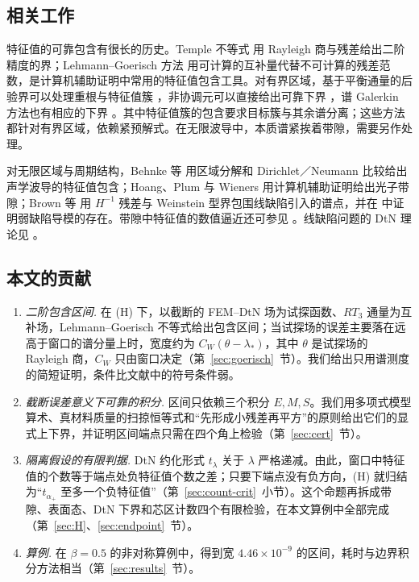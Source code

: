 \documentclass[11pt,a4paper,fontset=fandol]{ctexart}
\theoremstyle{plain}
\theoremstyle{definition}
\theoremstyle{remark}
\begin{document}
\subsection*{相关工作}

特征值的可靠包含有很长的历史。Temple 不等式 \cite{Temple1928} 用 Rayleigh 商与残差给出二阶精度的界；Lehmann--Goerisch 方法 \cite{NakaoPlumWatanabe2019} 用可计算的互补量代替不可计算的残差范数，是计算机辅助证明中常用的特征值包含工具。对有界区域，基于平衡通量的后验界可以处理重根与特征值簇 \cite{CancesDussonMadayStammVohralik2020}，非协调元可以直接给出可靠下界 \cite{CarstensenGedicke2014}，谱 Galerkin 方法也有相应的下界 \cite{Liu2026Spectral}。其中特征值簇的包含要求目标簇与其余谱分离；这些方法都针对有界区域，依赖紧预解式。在无限波导中，本质谱紧挨着带隙，需要另作处理。

对无限区域与周期结构，Behnke 等 \cite{BehnkeMertinsPlumWieners2000} 用区域分解和 Dirichlet／Neumann 比较给出声学波导的特征值包含；Hoang、Plum 与 Wieners \cite{HoangPlumWieners2009} 用计算机辅助证明给出光子带隙；Brown 等 \cite{BrownHoangPlumWood2009} 用 $H^{-1}$ 残差与 Weinstein 型界包围线缺陷引入的谱点，并在 \cite{BrownHoangPlumWood2015} 中证明弱缺陷导模的存在。带隙中特征值的数值逼近还可参见 \cite{BoultonLevitin2007,AljawiMarletta2023}。线缺陷问题的 DtN 理论见 \cite{JolyLiFliss2006,Coatleven2012,Fliss2013,FlissJolyLescarret2021}。

\subsection*{本文的贡献}

\begin{enumerate}
\item \emph{二阶包含区间.} 在 (H) 下，以截断的 FEM--DtN 场为试探函数、$RT_3$ 通量为互补场，Lehmann--Goerisch 不等式给出包含区间；当试探场的误差主要落在远高于窗口的谱分量上时，宽度约为 $C_W(\theta-\lambda_*)$，其中 $\theta$ 是试探场的 Rayleigh 商，$C_W$ 只由窗口决定（第~\ref{sec:goerisch}~节）。我们给出只用谱测度的简短证明，条件比文献中的符号条件弱。
\item \emph{截断误差意义下可靠的积分.} 区间只依赖三个积分 $E,M,S$。我们用多项式模型算术、真材料质量的扫掠恒等式和“先形成小残差再平方”的原则给出它们的显式上下界，并证明区间端点只需在四个角上检验（第~\ref{sec:cert}~节）。
\item \emph{隔离假设的有限判据.} DtN 约化形式 $t_\lambda$ 关于 $\lambda$ 严格递减。由此，窗口中特征值的个数等于端点处负特征值个数之差；只要下端点没有负方向，(H) 就归结为“$t_{\alpha_+}$ 至多一个负特征值”（第~\ref{sec:count-crit}~小节）。这个命题再拆成带隙、表面态、DtN 下界和芯区计数四个有限检验，在本文算例中全部完成（第~\ref{sec:H}、\ref{sec:endpoint}~节）。
\item \emph{算例.} 在 $\beta=0.5$ 的非对称算例中，得到宽 $4.46\times10^{-9}$ 的区间，耗时与边界积分方法相当（第~\ref{sec:results}~节）。
\end{enumerate}
\end{document}
